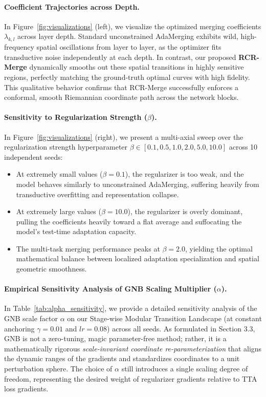 \paragraph{Coefficient Trajectories across Depth.}
In Figure~\ref{fig:visualizations} (left), we visualize the optimized merging coefficients $\lambda_{k, l}$ across layer depth. Standard unconstrained AdaMerging exhibits wild, high-frequency spatial oscillations from layer to layer, as the optimizer fits transductive noise independently at each depth. In contrast, our proposed \textbf{RCR-Merge} dynamically smooths out these spatial transitions in highly sensitive regions, perfectly matching the ground-truth optimal curves with high fidelity. This qualitative behavior confirms that RCR-Merge successfully enforces a conformal, smooth Riemannian coordinate path across the network blocks.

\paragraph{Sensitivity to Regularization Strength ($\beta$).}
In Figure~\ref{fig:visualizations} (right), we present a multi-axial sweep over the regularization strength hyperparameter $\beta \in [0.1, 0.5, 1.0, 2.0, 5.0, 10.0]$ across 10 independent seeds:
\begin{itemize}
    \item At extremely small values ($\beta = 0.1$), the regularizer is too weak, and the model behaves similarly to unconstrained AdaMerging, suffering heavily from transductive overfitting and representation collapse.
    \item At extremely large values ($\beta = 10.0$), the regularizer is overly dominant, pulling the coefficients heavily toward a flat average and suffocating the model's test-time adaptation capacity.
    \item The multi-task merging performance peaks at $\beta = 2.0$, yielding the optimal mathematical balance between localized adaptation specialization and spatial geometric smoothness.
\end{itemize}

\paragraph{Empirical Sensitivity Analysis of GNB Scaling Multiplier ($\alpha$).}
In Table~\ref{tab:alpha_sensitivity}, we provide a detailed sensitivity analysis of the GNB scale factor $\alpha$ on our Stage-wise Modular Transition Landscape (at constant anchoring $\gamma = 0.01$ and $lr = 0.08$) across all seeds. As formulated in Section 3.3, GNB is not a zero-tuning, magic parameter-free method; rather, it is a mathematically rigorous \emph{scale-invariant coordinate re-parameterization} that aligns the dynamic ranges of the gradients and standardizes coordinates to a unit perturbation sphere. The choice of $\alpha$ still introduces a single scaling degree of freedom, representing the desired weight of regularizer gradients relative to TTA loss gradients.

